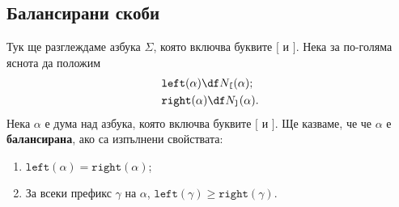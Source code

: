 \subsection*{Балансирани скоби}

Тук ще разглеждаме азбука $\Sigma$, която включва буквите $\texttt{[}$ и $\texttt{]}$.
Нека за по-голяма яснота да положим
\begin{align*}
  & \texttt{left}(\alpha) \df N_{\texttt{[}}(\alpha);\\
  & \texttt{right}(\alpha) \df N_{\texttt{]}}(\alpha).
\end{align*}
Нека $\alpha$ е дума над азбука, която включва буквите $\texttt{[}$ и $\texttt{]}$. 
Ще казваме, че че $\alpha$ е {\bf балансирана}, ако са изпълнени свойствата:
\begin{enumerate}[1)]
\item 
  $\texttt{left}(\alpha) = \texttt{right}(\alpha)$;
\item
  За всеки префикс $\gamma$ на $\alpha$,
  $\texttt{left}(\gamma) \geq \texttt{right}(\gamma)$.
\end{enumerate}
  
